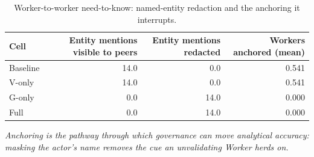 \begin{table}[htbp]
\centering
\small
\caption{Worker-to-worker need-to-know: named-entity redaction and the anchoring it interrupts.}
\label{tab:gmais-9}
\begin{tabular}{lrrr}
\toprule
Cell & Entity mentions visible to peers & Entity mentions redacted & Workers anchored (mean) \\
\midrule
Baseline & 14.0 & 0.0 & 0.541 \\
V-only & 14.0 & 0.0 & 0.541 \\
G-only & 0.0 & 14.0 & 0.000 \\
Full & 0.0 & 14.0 & 0.000 \\
\bottomrule
\end{tabular}
\par\vspace{2pt}\footnotesize\emph{Anchoring is the pathway through which governance can move analytical accuracy: masking the actor's name removes the cue an unvalidating Worker herds on.}
\end{table}
